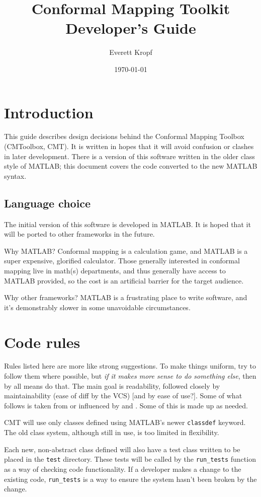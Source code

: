 \documentclass[12pt]{article}
\title{Conformal Mapping Toolkit Developer's Guide}
\author{Everett Kropf}
\date{\today}
\begin{document}
\maketitle
\tableofcontents
\clearpage

\section{Introduction}
This guide describes design decisions behind the Conformal Mapping Toolbox (CMToolbox, CMT). It is written in hopes that it will avoid confusion or clashes in later development. There is a version of this software written in the older class style of MATLAB; this document covers the code converted to the new MATLAB syntax.

\subsection{Language choice}
The initial version of this software is developed in MATLAB. It is hoped that it will be ported to other frameworks in the future.

Why MATLAB? Conformal mapping is a calculation game, and MATLAB is a super expensive, glorified calculator. Those generally interested in conformal mapping live in math(s) departments, and thus generally have access to MATLAB provided, so the cost is an artificial barrier for the target audience.

Why other frameworks? MATLAB is a frustrating place to write software, and it's demonstrably slower in some unavoidable circumstances.

\section{Code rules}
Rules listed here are more like strong suggestions. To make things uniform, try to follow them where possible, but \emph{if it makes more sense to do something else}, then by all means do that. The main goal is readability, followed closely by maintainability (ease of diff by the VCS) [and by ease of use?]. Some of what follows is taken from or influenced by \cite{chebfunCodingStyle} and \cite{pythonStyleGuide}. Some of this is made up as needed.

CMT will use only classes defined using MATLAB's newer \verb+classdef+ keyword. The old class system, although still in use, is too limited in flexibility.

Each new, non-abstract class defined will also have a test class written to be placed in the \verb+test+ directory. These tests will be called by the \verb+run_tests+ function as a way of checking code functionality. If a developer makes a change to the existing code, \verb+run_tests+ is a way to ensure the system hasn't been broken by the change.
\end{document}
